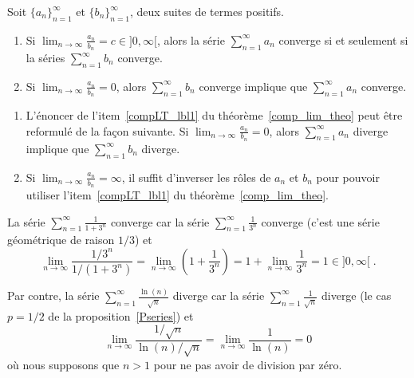 {\begin{focus}{\thm}
Soit $\displaystyle \{a_n\}_{n=1}^\infty$ et
$\displaystyle \{b_n\}_{n=1}^\infty$, deux suites de termes positifs.
\begin{enumerate}
\item Si $\displaystyle \lim_{n\rightarrow \infty} \frac{a_n}{b_n} = c
\in ]0,\infty[$, alors la série $\displaystyle \sum_{n=1}^\infty a_n$
converge si et seulement si la séries 
$\displaystyle \sum_{n=1}^\infty b_n$ converge.
\item \label{compLT_lbl1}
Si $\displaystyle \lim_{n\rightarrow \infty} \frac{a_n}{b_n} = 0$, alors
$\displaystyle \sum_{n=1}^\infty b_n$ converge implique que
$\displaystyle \sum_{n=1}^\infty a_n$ converge.
\end{enumerate}
\label{comp_lim_theo}
\end{focus}

\begin{rmkList}
\begin{enumerate}
\item L'énoncer de l'item~\ref{compLT_lbl1} du
théorème~\ref{comp_lim_theo} peut être reformulé de la façon
suivante.  Si
$\displaystyle \lim_{n\rightarrow \infty} \frac{a_n}{b_n} = 0$, alors 
$\displaystyle \sum_{n=1}^\infty a_n$ diverge implique que
$\displaystyle \sum_{n=1}^\infty b_n$ diverge.
\item Si $\displaystyle \lim_{n\rightarrow \infty} \frac{a_n}{b_n} = \infty$,
il suffit d'inverser les rôles de $a_n$ et $b_n$ pour pouvoir utiliser
l'item~\ref{compLT_lbl1} du théorème~\ref{comp_lim_theo}.
\end{enumerate}
\end{rmkList}

\begin{egg}
La série $\displaystyle \sum_{n=1}^\infty \frac{1}{1+3^n}$ converge
car la série $\displaystyle \sum_{n=1}^\infty \frac{1}{3^n}$ converge
(c'est une série géométrique de raison $1/3$) et
\[
\lim_{n\rightarrow \infty} \frac{1/3^n}{1/(1+3^n)} 
= \lim_{n\rightarrow \infty} \left( 1 + \frac{1}{3^n}\right) 
= 1 + \lim_{n\rightarrow \infty}\frac{1}{3^n} = 1 \in ]0,\infty[ \; .
\]

Par contre, la série $\displaystyle \sum_{n=1}^\infty \frac{\ln(n)}{\sqrt{n}}$
diverge car la série $\displaystyle \sum_{n=1}^\infty \frac{1}{\sqrt{n}}$
diverge (le cas $p=1/2$ de la proposition~\ref{Pseries}) et
\[
\lim_{n\rightarrow \infty} \frac{1/\sqrt{n}}{\ln(n)/\sqrt{n}} 
= \lim_{n\rightarrow \infty} \frac{1}{\ln(n)} = 0
\]
où nous supposons que $n>1$ pour ne pas avoir de division par zéro.
\end{egg}

}
